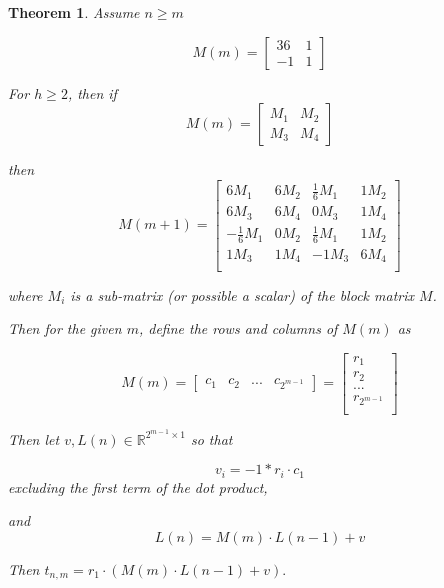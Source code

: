 \documentclass[12pt]{article}
\theoremstyle{plain}
\newtheorem{thm}{Theorem}
\theoremstyle{definition}
\theoremstyle{remark}
\theoremstyle{definition}
\begin{document}
\begin{thm}

Assume $n \geq m $

$$
M(m) = \begin{bmatrix}
36 & 1 \\
-1 & 1
\end{bmatrix}
$$

For $h \geq 2$, then if
$$
M(m) = \begin{bmatrix}
M_1 & M_2 \\
M_3 & M_4
\end{bmatrix}
$$

then
$$
M(m+1) = \begin{bmatrix}
6M_1 & 6M_2 & \frac{1}{6}M_1 & 1M_2 \\
6M_3 & 6M_4 & 0M_3 & 1M_4 \\
-\frac{1}{6}M_1 & 0M_2 & \frac{1}{6}M_1 & 1M_2 \\
1M_3 & 1M_4 & -1M_3 & 6M_4 \\
\end{bmatrix}
$$

where $M_i$ is a sub-matrix (or possible a scalar) of the block matrix $M$.

Then for the given $m$, define the rows and columns of $M(m)$ as

$$
M(m) = 
\begin{bmatrix}
    c_1 & c_2 & ... & c_{2^{m-1}}
\end{bmatrix} = 
\begin{bmatrix}
    r_1 \\
    r_2 \\
    ... \\
    r_{2^{m-1}} \\
\end{bmatrix}
$$

Then let $v,L(n) \in \mathbb{R}^{2^{m-1} \times 1}$ so that

$$v_i = -1*r_i \cdot c_1$$
excluding the first term of the dot product,

and
$$L(n) = M(m) \cdot L(n-1)+v$$

Then $t_{n,m}=r_1 \cdot (M(m) \cdot L(n-1)+v).$

\end{thm}
\end{document}
